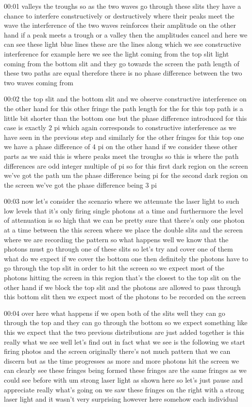 00:01
valleys the troughs so as the two waves go through
these slits they have a chance to interfere constructively or destructively
where their peaks meet the wave the interference of the two waves reinforces
their amplitude on the other hand if a peak meets a trough or a valley then the
amplitudes cancel and here we can see these light blue lines
these are the lines along which we see constructive interference
for example here we see the light coming from the top slit
light coming from the bottom slit and they go towards the screen
the path length of these two paths are equal therefore
there is no phase difference between the two two waves coming from

00:02
the top slit and the bottom slit and we observe constructive interference
on the other hand for this other fringe the path length for the for this top
path is a little bit shorter than the bottom one but the phase
difference introduced for this case is exactly 2 pi which
again corresponds to constructive interference as we have seen in the
previous step and similarly for the other fringes for this top one
we have a phase difference of 4 pi on the other hand if we consider these
other parts as we said this is where peaks meet the troughs
so this is where the path differences are odd
integer multiple of pi so for this first dark region on the screen we've got the
path um the phase difference being pi for the second
dark region on the screen we've got the phase difference being 3 pi

00:03
now let's consider the scenario where we attenuate the laser light
to such low levels that it's only firing single photons at a time
and furthermore the level of attenuation is so high
that we can be pretty sure that there's only one photon
at a time between the this screen where we place the double slits
and the screen where we are recording the pattern
so what happens well we know that the photons must go through one of these slits
so let's try and cover one of them what do we expect
if we cover the bottom one then definitely the photons have to go
through the top slit in order to hit the screen so we expect
most of the photons hitting the screen in this region that's the closest to the
top slit on the other hand if we block the top slit
and the photons are allowed to pass through this bottom slit
then we expect most of the photons to be recorded on the screen

00:04
over here what happens if we open both of the slits well they can go through
the top and they can go through the bottom so we
expect something like this we expect that the two previous distributions
are just added together is this really what we see well let's find out
in fact what we see is the following we start firing photos and the screen
originally there's not much pattern that we can discern but
as the time progresses as more and more photons hit the screen we can clearly
see these fringes being formed these fringes
are the same fringes as we could see before with um strong laser light
as shown here so let's just pause and appreciate really what's going on
we saw these fringes on the right with a strong laser light and it wasn't very
surprising however here somehow each individual

